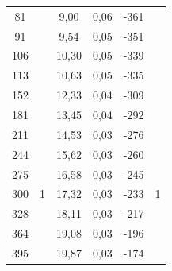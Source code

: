 \documentclass[a4paper,12pt]{report}
\begin{document}
\begin{table}[H]
\begin{tabular}{|c|c|c|c|c|c|}
81                            &                                       & 9,00                              & 0,06                              & -361                         &                                      \\ \cline{1-1} \cline{3-5}
91                            &                                       & 9,54                              & 0,05                              & -351                         &                                      \\ \cline{1-1} \cline{3-5}
106                           &                                       & 10,30                             & 0,05                              & -339                         &                                      \\ \cline{1-1} \cline{3-5}
113                           &                                       & 10,63                             & 0,05                              & -335                         &                                      \\ \cline{1-1} \cline{3-5}
152                           &                                       & 12,33                             & 0,04                              & -309                         &                                      \\ \cline{1-1} \cline{3-5}
181                           &                                       & 13,45                             & 0,04                              & -292                         &                                      \\ \hline
211 & \multirow{13}{*}{1} & 14,53 & 0,03 & -276 & \multirow{13}{*}{1} \\ \cline{1-1} \cline{3-5}
244 &                     & 15,62 & 0,03 & -260 &                     \\ \cline{1-1} \cline{3-5}
275 &                     & 16,58 & 0,03 & -245 &                     \\ \cline{1-1} \cline{3-5}
300 &                     & 17,32 & 0,03 & -233 &                     \\ \cline{1-1} \cline{3-5}
328 &                     & 18,11 & 0,03 & -217 &                     \\ \cline{1-1} \cline{3-5}
364 &                     & 19,08 & 0,03 & -196 &                     \\ \cline{1-1} \cline{3-5}
395 &                     & 19,87 & 0,03 & -174 &                     \\ \cline{1-1} \cline{3-5}

\end{tabular}
\end{table}
\end{document}
